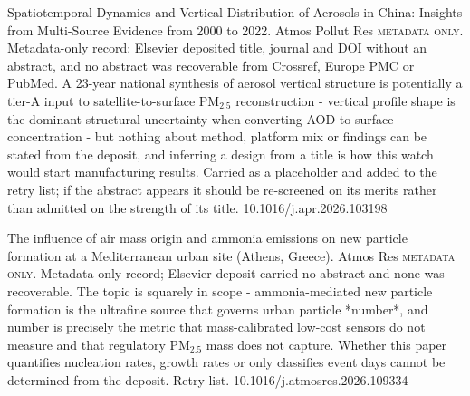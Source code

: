 \documentclass[10pt]{article}
\begin{document}
{Spatiotemporal Dynamics and Vertical Distribution of Aerosols in China: Insights from Multi-Source Evidence from 2000 to 2022.}
{Atmos Pollut Res}
{\textsc{metadata only.} Metadata-only record: Elsevier deposited title, journal and DOI without an abstract, and no abstract was recoverable from Crossref, Europe PMC or PubMed. A 23-year national synthesis of aerosol vertical structure is potentially a tier-A input to satellite-to-surface PM$_{2.5}$ reconstruction - vertical profile shape is the dominant structural uncertainty when converting AOD to surface concentration - but nothing about method, platform mix or findings can be stated from the deposit, and inferring a design from a title is how this watch would start manufacturing results. Carried as a placeholder and added to the retry list; if the abstract appears it should be re-screened on its merits rather than admitted on the strength of its title.}
{10.1016/j.apr.2026.103198}

{The influence of air mass origin and ammonia emissions on new particle formation at a Mediterranean urban site (Athens, Greece).}
{Atmos Res}
{\textsc{metadata only.} Metadata-only record; Elsevier deposit carried no abstract and none was recoverable. The topic is squarely in scope - ammonia-mediated new particle formation is the ultrafine source that governs urban particle *number*, and number is precisely the metric that mass-calibrated low-cost sensors do not measure and that regulatory PM$_{2.5}$ mass does not capture. Whether this paper quantifies nucleation rates, growth rates or only classifies event days cannot be determined from the deposit. Retry list.}
{10.1016/j.atmosres.2026.109334}

\end{document}
